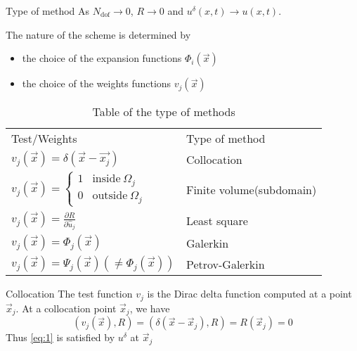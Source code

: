 \begin{frame}{Type of method}
  As $N_{\text{dof}} \rightarrow 0$, $R \rightarrow 0$ and
  $u^{\delta}(x,t) \rightarrow u(x,t)$.

  The nature of the scheme is determined by
  \begin{itemize}
  \item the choice of the expansion functions $\Phi_i(\overrightarrow{x})$
  \item the choice of the weights functions $v_j(\overrightarrow{x})$
  \end{itemize}

  \begin{table}[H]
    \centering

    \begin{tabular}[c]{ll}
    \rowcolor[gray]{1}
    Test/Weights & Type of method\\

    \rowcolor[gray]{.7}
    $v_j(\overrightarrow{x}) = \delta(\overrightarrow{x} - \overrightarrow{x_j})$ 	& Collocation \\


    \rowcolor[gray]{1}
    $v_j(\overrightarrow{x})=
      \begin{cases}
        1 & \text{inside} \ \Omega_j\\
        0 & \text{outside} \ \Omega_j
      \end{cases}$ & Finite volume(subdomain)\\

    \rowcolor[gray]{.7}
    $v_j(\overrightarrow{x}) = \frac{\partial R}{\partial \hat{u}_j}$ & Least square\\

    \rowcolor[gray]{1}
    $v_j(\overrightarrow{x}) = \Phi_j(\overrightarrow{x})$ & Galerkin\\

    \rowcolor[gray]{.7}
    $v_j(\overrightarrow{x}) = \Psi_j(\overrightarrow{x}) (\neq \Phi_j(\overrightarrow{x}))$ & Petrov-Galerkin\\
    \end{tabular}
    \caption{Table of the type of methods}
    \label{tab:1}
  \end{table}

\end{frame}

\begin{frame}{Collocation}
  The test function $v_j$ is the Dirac delta function computed at a point $\overrightarrow{x}_j$.
  At a collocation point $\overrightarrow{x}_j$, we have
  \begin{equation}
    \label{eq:6}
    ( v_j(\overrightarrow{x}), R ) = ( \delta(\overrightarrow{x} - \overrightarrow{x}_j), R ) =  R(\overrightarrow{x}_j) = 0
  \end{equation}
  Thus \eqref{eq:1} is satisfied by $u^{\delta}$ at $\overrightarrow{x}_j$
\end{frame}

